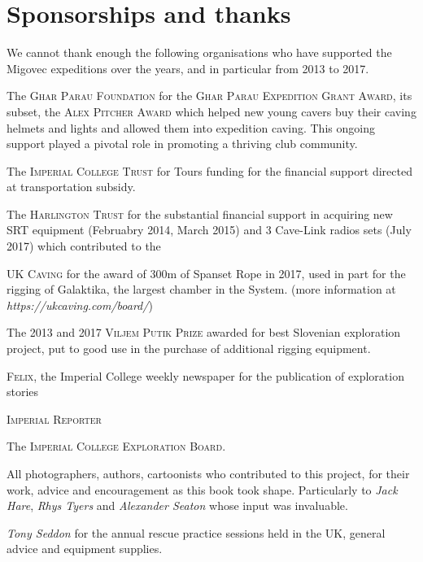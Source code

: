 \chapter{Sponsorships and thanks}
We cannot thank enough the following organisations who have supported the Migovec expeditions over the years, and in particular from 2013 to 2017.
\begin{citemize}
\item The \textsc{Ghar Parau Foundation} for  the \textsc{Ghar Parau Expedition Grant Award}, its subset, the \textsc{Alex Pitcher Award} which helped new young cavers buy their caving helmets and lights and allowed them into expedition caving. This ongoing support played a pivotal role in promoting a thriving club community.

\item The \textsc{Imperial College Trust} for Tours funding for the financial support directed at transportation subsidy.
\item The \textsc{Harlington Trust} for the substantial financial support in acquiring new SRT equipment (Februabry 2014, March 2015) and 3 Cave-Link radios sets (July 2017) which contributed to the 
\item \textsc{UK Caving} for the award of 300m of Spanset Rope in 2017, used  in part for the rigging of Galaktika, the largest chamber in the System. (more information at \emph{https://ukcaving.com/board/})
\item The \textsc{2013} and \textsc{2017 Viljem Putik Prize} awarded for best Slovenian exploration project, put to good use in the purchase of additional rigging equipment.
\item \textsc{Felix}, the Imperial College weekly newspaper for the publication of exploration stories
\item \textsc{Imperial Reporter}
\item The \textsc{Imperial College Exploration Board}.

\mydelimiter

\item All photographers, authors, cartoonists who contributed to this project, for their work, advice and encouragement as this book took shape. Particularly to \emph{Jack Hare}, \emph{Rhys Tyers} and \emph{Alexander Seaton} whose input was invaluable. 

\item \emph{Tony Seddon} for the annual rescue practice sessions held in the UK, general advice and equipment supplies.


\end{citemize}
